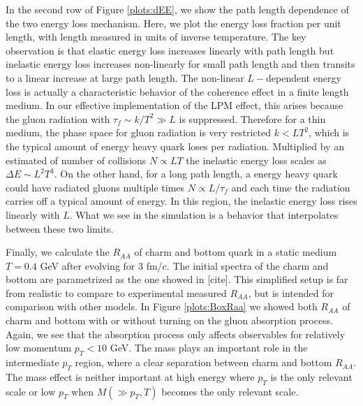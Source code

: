 \documentclass[aps, prc, reprint, amsmath, groupedaddress, nofootinbib]{revtex4-1}
\begin{document}
In the second row of Figure \ref{plots:dEE}, we show the path length dependence of the two energy loss mechanism.
Here, we plot the energy loss fraction per unit length, with length measured in units of inverse temperature.
The key observation is that elastic energy loss increases linearly with path length but inelastic energy loss increases non-linearly for small path length and then transits to a linear increase at large path length. 
The non-linear $L-$dependent energy loss is actually a characteristic behavior of the coherence effect in a finite length medium. 
In our effective implementation of the LPM effect, this arises because the gluon radiation with $\tau_f \sim k/T^2 \gg L$ is suppressed.
Therefore for a thin medium, the phase space for gluon radiation is very restricted $k < LT^2$, which is the typical amount of energy heavy quark loses per radiation.
Multiplied by an estimated of number of collisions $N \propto LT$ the inelastic energy loss scales as $\Delta E \sim L^2T^3$.
On the other hand, for a long path length, a energy heavy quark could have radiated gluons multiple times $N \propto L/\tau_f$ and each time the radiation carries off a typical amount of energy. 
In this region, the inelastic energy loss rises linearly with $L$.
What we see in the simulation is a behavior that interpolates between these two limits.

Finally, we calculate the $R_{AA}$ of charm and bottom quark in a static medium $T=0.4$ GeV after evolving for $3$ fm/c.
The initial spectra of the charm and bottom are parametrized as the one showed in [cite].
This simplified setup is far from realistic to compare to experimental measured $R_{AA}$, but is intended for comparison with other models.
In Figure \ref{plots:BoxRaa} we showed both $R_{AA}$ of charm and bottom with or without turning on the gluon absorption process. 
Again, we see that the absorption process only affects observables for relatively low momentum $p_T < 10$ GeV.
The mass plays an important role in the intermediate $p_T$ region, where a clear separation between charm and bottom $R_{AA}$.
The mass effect is neither important at high energy where $p_T$ is the only relevant scale or low $p_T$ when $M (\gg p_T, T)$ becomes the only relevant scale. 
\end{document}
